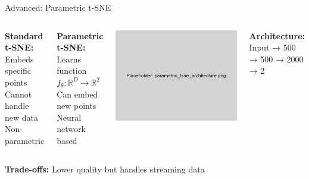 \documentclass[aspectratio=169]{beamer}
\begin{document}
\begin{frame}{Advanced: Parametric t-SNE}
\begin{columns}
\textbf{Standard t-SNE:}\\
Embeds specific points\\
Cannot handle new data\\
Non-parametric

\vspace{0.3cm}
\textbf{Parametric t-SNE:}\\
Learns function $f_\theta: \mathbb{R}^D \to \mathbb{R}^2$\\
Can embed new points\\
Neural network based

\includegraphics[width=\textwidth]{./Figures/parametric_tsne_architecture.png}

\textbf{Architecture:}\\
Input → 500 → 500 → 2000 → 2
\end{columns}

\textbf{Trade-offs:} Lower quality but handles streaming data
\end{frame}
\end{document}
